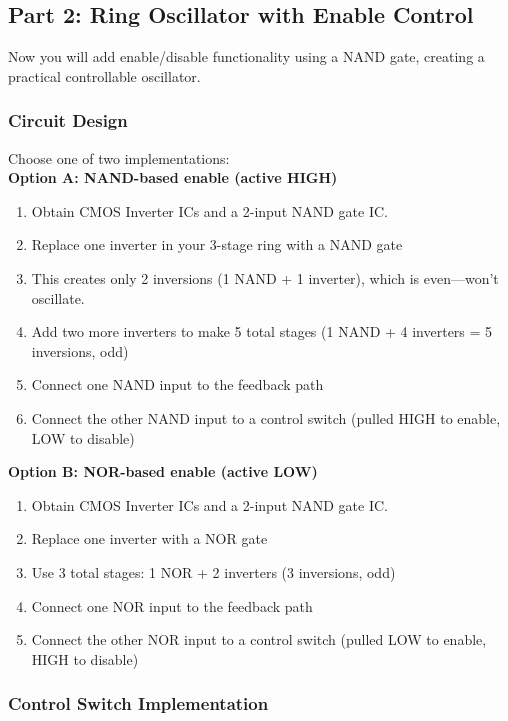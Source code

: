 \documentclass[10pt]{article}
\begin{document}
\subsection{Part 2: Ring Oscillator with Enable Control}

Now you will add enable/disable functionality using a NAND gate, creating a practical controllable oscillator.

\subsubsection{Circuit Design}

Choose one of two implementations: \\

\textbf{Option A:  NAND-based enable (active HIGH)}
\begin{enumerate}
    \item Obtain CMOS Inverter ICs and a 2-input NAND gate IC. 
    \item Replace one inverter in your 3-stage ring with a NAND gate
    \item This creates only 2 inversions (1 NAND + 1 inverter), which is even—won't oscillate.
    \item Add two more inverters to make 5 total stages (1 NAND + 4 inverters = 5 inversions, odd)
    \item Connect one NAND input to the feedback path
    \item Connect the other NAND input to a control switch (pulled HIGH to enable, LOW to disable)
\end{enumerate}

\textbf{Option B: NOR-based enable (active LOW)}
\begin{enumerate}
    \item Obtain CMOS Inverter ICs and a 2-input NAND gate IC. 
    \item Replace one inverter with a NOR gate
    \item Use 3 total stages:  1 NOR + 2 inverters (3 inversions, odd)
    \item Connect one NOR input to the feedback path
    \item Connect the other NOR input to a control switch (pulled LOW to enable, HIGH to disable)
\end{enumerate}

\subsubsection{Control Switch Implementation}
\end{document}
